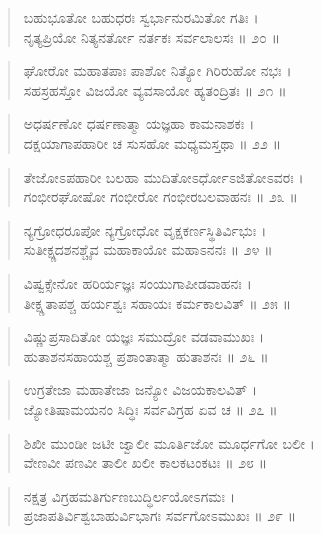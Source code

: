 \begin{verse}
ಬಹುಭೂತೋ ಬಹುಧರಃ ಸ್ವರ್ಭಾನುರಮಿತೋ ಗತಿಃ ।\\ನೃತ್ಯಪ್ರಿಯೋ ನಿತ್ಯನರ್ತೋ ನರ್ತಕಃ ಸರ್ವಲಾಲಸಃ \num{॥ ೨೦ ॥}
\end{verse}

\begin{verse}
ಘೋರೋ ಮಹಾತಪಾಃ ಪಾಶೋ ನಿತ್ಯೋ ಗಿರಿರುಹೋ ನಭಃ ।\\ಸಹಸ್ರಹಸ್ತೋ ವಿಜಯೋ ವ್ಯವಸಾಯೋ ಹ್ಯತಂದ್ರಿತಃ \num{॥ ೨೧ ॥}
\end{verse}

\begin{verse}
ಅಧರ್ಷಣೋ ಧರ್ಷಣಾತ್ಮಾ ಯಜ್ಞಹಾ ಕಾಮನಾಶಕಃ ।\\ದಕ್ಷಯಾಗಾಪಹಾರೀ ಚ ಸುಸಹೋ ಮಧ್ಯಮಸ್ತಥಾ \num{॥ ೨೨ ॥}
\end{verse}

\begin{verse}
ತೇಜೋಽಪಹಾರೀ ಬಲಹಾ ಮುದಿತೋಽರ್ಧೋಽಜಿತೋಽವರಃ ।\\ಗಂಭೀರಘೋಷೋ ಗಂಭೀರೋ ಗಂಭೀರಬಲವಾಹನಃ \num{॥ ೨೩ ॥}
\end{verse}

\begin{verse}
ನ್ಯಗ್ರೋಧರೂಪೋ ನ್ಯಗ್ರೋಧೋ ವೃಕ್ಷಕರ್ಣಸ್ಥಿತಿರ್ವಿಭುಃ ।\\ಸುತೀಕ್ಷ್ಣದಶನಶ್ಚೈವ ಮಹಾಕಾಯೋ ಮಹಾಽನನಃ \num{॥ ೨೪ ॥}
\end{verse}

\begin{verse}
ವಿಷ್ವಕ್ಸೇನೋ ಹರಿರ್ಯಜ್ಞಃ ಸಂಯುಗಾಪೀಡವಾಹನಃ ।\\ತೀಕ್ಷ್ಣತಾಪಶ್ಚ ಹರ್ಯಶ್ವಃ ಸಹಾಯಃ ಕರ್ಮಕಾಲವಿತ್ \num{॥ ೨೫ ॥}
\end{verse}

\begin{verse}
ವಿಷ್ಣುಪ್ರಸಾದಿತೋ ಯಜ್ಞಃ ಸಮುದ್ರೋ ವಡವಾಮುಖಃ ।\\ಹುತಾಶನಸಹಾಯಶ್ಚ ಪ್ರಶಾಂತಾತ್ಮಾ ಹುತಾಶನಃ \num{॥ ೨೬ ॥}
\end{verse}

\begin{verse}
ಉಗ್ರತೇಜಾ ಮಹಾತೇಜಾ ಜನ್ಯೋ ವಿಜಯಕಾಲವಿತ್ ।\\ಜ್ಯೋತಿಷಾಮಯನಂ ಸಿದ್ಧಿಃ ಸರ್ವವಿಗ್ರಹ ಏವ ಚ \num{॥ ೨೭ ॥}
\end{verse}

\begin{verse}
ಶಿಖೀ ಮುಂಡೀ ಜಟೀ ಜ್ವಾಲೀ ಮೂರ್ತಿಜೋ ಮೂರ್ಧಗೋ ಬಲೀ ।\\ವೇಣವೀ ಪಣವೀ ತಾಲೀ ಖಲೀ ಕಾಲಕಟಂಕಟಃ \num{॥ ೨೮ ॥}
\end{verse}

\begin{verse}
ನಕ್ಷತ್ರ ವಿಗ್ರಹಮತಿರ್ಗುಣಬುದ್ಧಿರ್ಲಯೋಽಗಮಃ ।\\ಪ್ರಜಾಪತಿರ್ವಿಶ್ವಬಾಹುರ್ವಿಭಾಗಃ ಸರ್ವಗೋಽಮುಖಃ \num{॥ ೨೯ ॥}
\end{verse}

